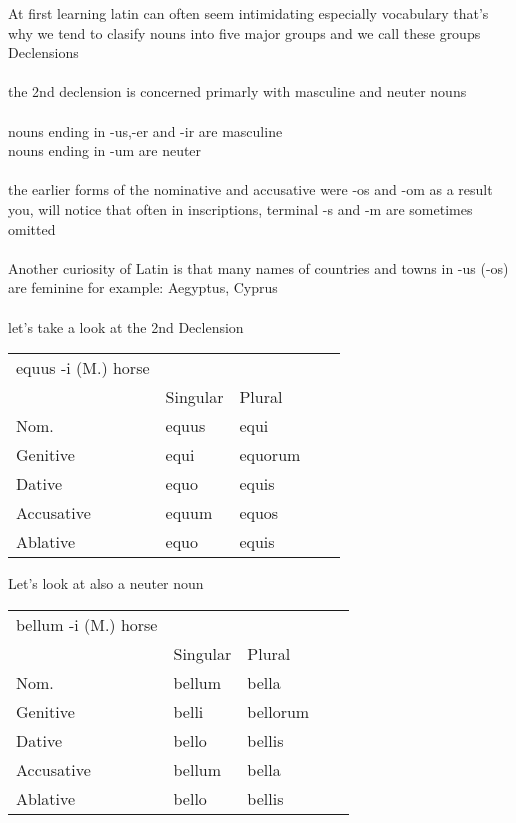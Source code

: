 At first learning latin can often seem intimidating especially vocabulary
that's why we tend to clasify nouns into five major groups and we call these
groups Declensions \\\\ 
the 2nd declension is concerned primarly with masculine and neuter nouns\\\\
nouns ending in -us,-er and -ir are masculine \\
nouns ending in -um are neuter \\\\
the earlier forms of the nominative and accusative were -os and -om
as a result you, will notice that often in inscriptions, terminal
-s and -m are sometimes omitted \\\\ 
Another curiosity of Latin is that many names of countries 
and towns in -us (-os) are feminine for example: Aegyptus, Cyprus \\\\ 
let's take a look at the 2nd Declension 
\begin{center}  
  \begin{tabular}{lllll}
    equus -i (M.) horse & & & \\
    & Singular & Plural &  \\
    Nom. & equus & equi  \\
    Genitive & equi & equorum \\ 
    Dative & equo & equis \\
    Accusative & equum & equos \\ 
    Ablative & equo & equis \\ 
  \end{tabular}
\end{center}
Let's look at also a neuter noun
\begin{center}  
  \begin{tabular}{lllll}
    bellum  -i (M.) horse & & & \\
    & Singular & Plural &  \\
    Nom. & bellum & bella \\
    Genitive & belli & bellorum \\ 
    Dative & bello & bellis \\
    Accusative & bellum & bella \\ 
    Ablative & bello & bellis \\ 
  \end{tabular}
\end{center}
